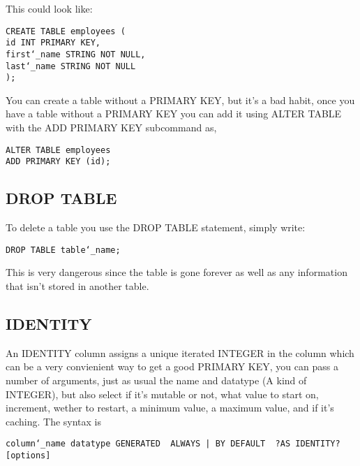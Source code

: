 \documentclass[10pt, english]{article}
\begin{document}
This could look like:

\texttt{CREATE TABLE employees ( \\
\hspace*{10pt} id INT PRIMARY KEY, \\
\hspace*{10pt} first\char`_name STRING NOT NULL, \\
\hspace*{10pt} last\char`_name STRING NOT NULL \\
);
}

You can create a table without a PRIMARY KEY, but it's a bad habit, once you have a table without a PRIMARY KEY you can
add it using ALTER TABLE with the ADD PRIMARY KEY subcommand as,

\texttt{ALTER TABLE employees \\
ADD PRIMARY KEY (id);
}

\subsection{DROP TABLE}
To delete a table you use the DROP TABLE statement, simply write:

\texttt{DROP TABLE table\char`_name;}

This is very dangerous since the table is gone forever as well as any information that isn't stored in another table.

\subsection{IDENTITY}
An IDENTITY column assigns a unique iterated INTEGER in the column which can be a very convienient way to get a good PRIMARY KEY, you can pass a number of arguments, 
just as usual the name and datatype (A kind of INTEGER), but also select if it's mutable or not, what value to start on, increment, wether to restart, a minimum value, a maximum value, and 
if it's caching. The syntax is 

\texttt{column\char`_name datatype GENERATED { ALWAYS | BY DEFAULT } ?AS IDENTITY? [options]}
\end{document}
